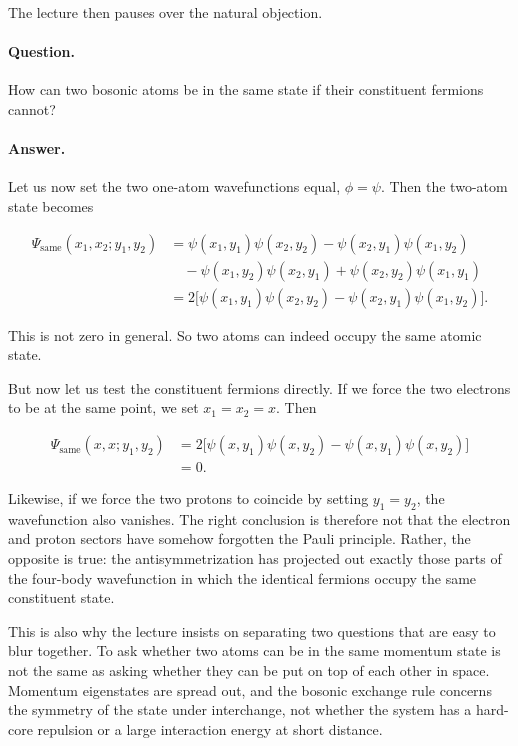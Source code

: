 The lecture then pauses over the natural objection.

\paragraph{Question.} How can two bosonic atoms be in the same state if their constituent fermions cannot?

\paragraph{Answer.} Let us now set the two one-atom wavefunctions equal, \(\phi=\psi\). Then the two-atom state becomes

\begin{align}
\Psi_{\mathrm{same}}(x_1,x_2;y_1,y_2)
&=
\psi(x_1,y_1)\psi(x_2,y_2)
-\psi(x_2,y_1)\psi(x_1,y_2)\nonumber\\
&\quad
-\psi(x_1,y_2)\psi(x_2,y_1)
+\psi(x_2,y_2)\psi(x_1,y_1)\\
&=
2\Big[\psi(x_1,y_1)\psi(x_2,y_2)-\psi(x_2,y_1)\psi(x_1,y_2)\Big].
\end{align}

This is not zero in general. So two atoms can indeed occupy the same atomic state.

But now let us test the constituent fermions directly. If we force the two electrons to be at the same point, we set \(x_1=x_2=x\). Then

\begin{align}
\Psi_{\mathrm{same}}(x,x;y_1,y_2)
&=
2\Big[\psi(x,y_1)\psi(x,y_2)-\psi(x,y_1)\psi(x,y_2)\Big]\\
&=0.
\end{align}

Likewise, if we force the two protons to coincide by setting \(y_1=y_2\), the wavefunction also vanishes. The right conclusion is therefore not that the electron and proton sectors have somehow forgotten the Pauli principle. Rather, the opposite is true: the antisymmetrization has projected out exactly those parts of the four-body wavefunction in which the identical fermions occupy the same constituent state.

This is also why the lecture insists on separating two questions that are easy to blur together. To ask whether two atoms can be in the same momentum state is not the same as asking whether they can be put on top of each other in space. Momentum eigenstates are spread out, and the bosonic exchange rule concerns the symmetry of the state under interchange, not whether the system has a hard-core repulsion or a large interaction energy at short distance.

